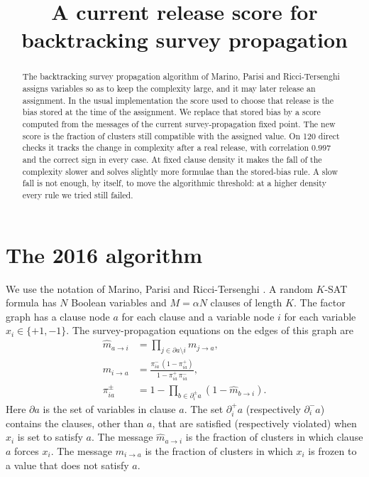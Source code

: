 \documentclass[11pt]{article}
\title{A current release score for backtracking survey propagation}
\author{}
\date{}
\begin{document}
\maketitle

\begin{abstract}
The backtracking survey propagation algorithm of Marino, Parisi and Ricci-Tersenghi assigns variables so as to keep the complexity large, and it may later release an assignment. In the usual implementation the score used to choose that release is the bias stored at the time of the assignment. We replace that stored bias by a score computed from the messages of the current survey-propagation fixed point. The new score is the fraction of clusters still compatible with the assigned value. On 120 direct checks it tracks the change in complexity after a real release, with correlation $0.997$ and the correct sign in every case. At fixed clause density it makes the fall of the complexity slower and solves slightly more formulae than the stored-bias rule. A slow fall is not enough, by itself, to move the algorithmic threshold: at a higher density every rule we tried still failed.
\end{abstract}

\section{The 2016 algorithm}

We use the notation of Marino, Parisi and Ricci-Tersenghi \cite{marino2016}. A random $K$-SAT formula has $N$ Boolean variables and $M=\alpha N$ clauses of length $K$. The factor graph has a clause node $a$ for each clause and a variable node $i$ for each variable $x_i\in\{+1,-1\}$. The survey-propagation equations on the edges of this graph are
\begin{align}
\hat m_{a\to i}
&=
\prod_{j\in\partial a\setminus i} m_{j\to a},
\label{eq:sp1}
\\
m_{i\to a}
&=
\frac{\pi^-_{ia}\,(1-\pi^+_{ia})}{1-\pi^+_{ia}\,\pi^-_{ia}},
\label{eq:sp2}
\\
\pi^{\pm}_{ia}
&=
1-\prod_{b\in\partial^{\pm}_i a}(1-\hat m_{b\to i}).
\label{eq:sp3}
\end{align}
Here $\partial a$ is the set of variables in clause $a$. The set $\partial^+_i a$ (respectively $\partial^-_i a$) contains the clauses, other than $a$, that are satisfied (respectively violated) when $x_i$ is set to satisfy $a$. The message $\hat m_{a\to i}$ is the fraction of clusters in which clause $a$ forces $x_i$. The message $m_{i\to a}$ is the fraction of clusters in which $x_i$ is frozen to a value that does not satisfy $a$.
\end{document}
